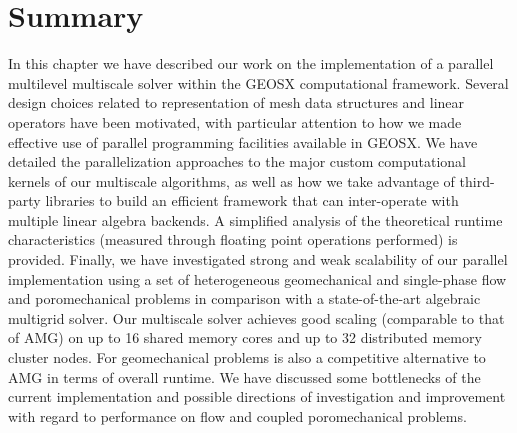 
\section{Summary}
\label{sec:par_summary}

In this chapter we have described our work on the implementation of a parallel multilevel multiscale solver within the GEOSX computational framework.   Several design choices related to representation of mesh data structures and linear operators have been motivated, with particular attention to how we made effective use of parallel programming facilities available in GEOSX.   We have detailed the parallelization approaches to the major custom computational kernels of our multiscale algorithms, as well as how we take advantage of third-party libraries to build an efficient framework that can inter-operate with multiple linear algebra backends.   A simplified analysis of the theoretical runtime characteristics (measured through floating point operations performed) is provided.   Finally, we have investigated strong and weak scalability of our parallel implementation using a set of heterogeneous geomechanical and single-phase flow and poromechanical problems in comparison with a state-of-the-art algebraic multigrid solver.   Our multiscale solver achieves good scaling (comparable to that of AMG) on up to 16 shared memory cores and up to 32 distributed memory cluster nodes.   For geomechanical problems is also a competitive alternative to AMG in terms of overall runtime.   We have discussed some bottlenecks of the current implementation and possible directions of investigation and improvement with regard to performance on flow and coupled poromechanical problems.
